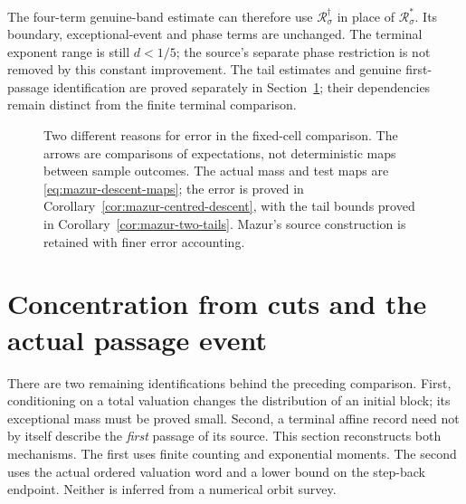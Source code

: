 \documentclass[11pt]{article}
\theoremstyle{remark}\newtheorem{remark}[proposition]{Remark}
\begin{document}
The four-term genuine-band estimate can therefore use
$\mathcal R_\sigma^\dagger$ in place of $\mathcal R_\sigma^*$.
Its boundary, exceptional-event and phase terms are unchanged.
The terminal exponent range is still $d<1/5$; the source's separate
phase restriction is not removed by this constant improvement.
The tail estimates and genuine first-passage identification are proved
separately in Section~\ref{sec:mazur-concentration-coverage}; their
dependencies remain distinct from the finite terminal comparison.

\begin{figure}[ht]
\centering
{}
\caption{Two different reasons for error in the fixed-cell comparison.
The arrows are comparisons of expectations, not deterministic maps
between sample outcomes. The actual mass and test maps are
\eqref{eq:mazur-descent-maps}; the error is proved in
Corollary~\ref{cor:mazur-centred-descent}, with the tail bounds proved in
Corollary~\ref{cor:mazur-two-tails}.
Mazur's source construction is retained with finer error accounting.}
\label{fig:mazur-descent}
\end{figure}


\section{Concentration from cuts and the actual passage event}
\label{sec:mazur-concentration-coverage}

There are two remaining identifications behind the preceding comparison.
First, conditioning on a total valuation changes the distribution of an
initial block; its exceptional mass must be proved small.
Second, a terminal affine record need not by itself describe the
\emph{first} passage of its source. This section reconstructs both
mechanisms. The first uses finite counting and exponential moments.
The second uses the actual ordered valuation word and a lower bound on
the step-back endpoint. Neither is inferred from a numerical orbit survey.
\end{document}

